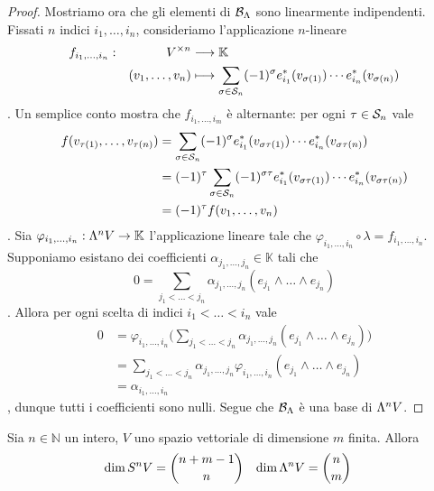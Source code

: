 \begin{proof}
Mostriamo ora che gli elementi di $\mathcal{B}_\Lambda$ sono linearmente indipendenti. Fissati $n$ indici $i_1,\ldots,i_n$, consideriamo l'applicazione $n$-lineare
\begin{alignat*}{2}
f_{i_1,\ldots,i_n}:&&V^{\times n}&\longrightarrow\mathbb{K}\\
&&(v_1,\ldots,v_n)&\longmapsto\sum_{\sigma\in\mathcal{S}_n}(-1)^\sigma e_{i_1}^*(v_{\sigma(1)})\cdots e_{i_n}^*(v_{\sigma(n)})
\end{alignat*}
. Un semplice conto mostra che $f_{i_1,\ldots,i_m}$ è alternante: per ogni $\tau\in\mathcal{S}_n$ vale
\begin{align*}
f(v_{\tau(1)},\ldots,v_{\tau(n)})&=\sum_{\sigma\in\mathcal{S}_n}(-1)^\sigma e_{i_1}^*(v_{\sigma\tau(1)})\cdots e_{i_n}^*(v_{\sigma\tau(n)})\\
&=(-1)^\tau\sum_{\sigma\in\mathcal{S}_n}(-1)^{\sigma\tau} e_{i_1}^*(v_{\sigma\tau(1)})\cdots e_{i_n}^*(v_{\sigma\tau(n)})\\
&=(-1)^\tau f(v_1,\ldots,v_n)
\end{align*}
. Sia $\varphi_{i_1,\ldots,i_n}:\Lambda^nV\to\mathbb{K}$ l'applicazione lineare tale che $\varphi_{i_1,\ldots,i_n}\circ\lambda=f_{i_1,\ldots,i_n}$. Supponiamo esistano dei coefficienti $\alpha_{j_1,\ldots,j_n}\in\mathbb{K}$ tali che
$$
0=\sum_{j_1<\ldots<j_n}\alpha_{j_1,\ldots,j_n}(e_{j_1}\wedge\ldots\wedge e_{j_n})
$$
. Allora per ogni scelta di indici $i_1<\ldots<i_n$ vale
\begin{align*}
0&=\varphi_{i_1,\ldots,i_n}\biggl(\sum_{j_1<\ldots<j_n}\alpha_{j_1,\ldots,j_n}(e_{j_1}\wedge\ldots\wedge e_{j_n})\biggr)\\
&=\sum_{j_1<\ldots<j_n}\alpha_{j_1,\ldots,j_n}\varphi_{i_1,\ldots,i_n}(e_{j_1}\wedge\ldots\wedge e_{j_n})\\
&=\alpha_{i_1,\ldots,i_n}
\end{align*}
, dunque tutti i coefficienti sono nulli. Segue che $\mathcal{B}_\Lambda$ è una base di $\Lambda^nV$.
\end{proof}

\begin{corollary}
Sia $n\in\mathbb{N}$ un intero, $V$ uno spazio vettoriale di dimensione $m$ finita. Allora
\begin{align*}
\dim S^nV&=\binom{n+m-1}{n}&\dim\Lambda^nV&=\binom{n}{m}
\end{align*}
\end{corollary}

